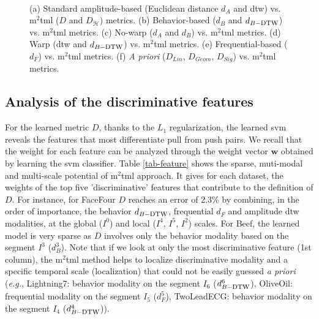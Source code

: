 \begin{figure}[h!]
	\centering
	\
	 \
	 	\	   
	\caption{(a) Standard amplitude-based (Euclidean distance $d_A$  and {\sc dtw}) vs. {\sc m}$^2${\sc tml} ($D$ and $D_{\mathcal{H}}$) metrics. 
	(b) Behavior-based ($d_B$  and $d_{B-\mbox{\sc dtw}}$) vs. {\sc m}$^2${\sc tml} metrics. 	
	(c) No-warp ($d_A$  and $d_{B}$) vs. {\sc m}$^2${\sc tml} metrics. 
	(d) Warp ({\sc dtw}  and $d_{B-\mbox{\sc dtw}}$) vs. {\sc m}$^2${\sc tml}  metrics. 	
	(e) Frequential-based ($d_F$) vs. {\sc m}$^2${\sc tml} metrics.
	(f) \textit{A priori} ($D_{Lin}$, $D_{Geom}$, $D_{Sig}$) vs. {\sc m}$^2${\sc tml} metrics. 
	}
	\label{fig:error2}
\end{figure}


\subsection{Analysis of the discriminative features}
For the learned metric $D$, thanks to the $L_1$ regularization, the learned {\sc svm} reveals the features that most differentiate pull from push pairs. We recall that the weight for each feature can be analyzed through the weight vector $\textbf{w}$ obtained by learning the {\sc svm} classifier. Table \ref{tab-feature} shows the sparse, muti-modal and multi-scale potential of {\sc m}$^2${\sc tml} approach.  It gives for each dataset, the weights of the top five 'discriminative' features that contribute to the definition of $D$.  For instance,   for FaceFour $D$ reaches an error of 2.3\% by combining, in the order of importance, the behavior $d_{B-\mbox{\sc dtw}}$,  frequential $d_F$ and amplitude {\sc dtw} modalities, at the global ($I^0$) and  local ($I^4$, $I^5$, $I^2$) scales. For Beef, the learned model is very sparse as $D$ involves only the behavior modality based on the segment $I^3$ ($d_B^3$). Note that if we look at only the most discriminative feature (1st column), the {\sc m}$^2${\sc tml} method helps to localize discriminative modality and a specific temporal scale (localization) that could not be easily guessed \textit{a priori} (\textit{e.g.}, Lightning7: behavior modality on the segment $I_6$ ($d_{B-\mbox{\sc dtw}}^6$), OliveOil: frequential modality on the segment $I_5$ ($d_F^5$), TwoLeadECG: behavior modality on the segment $I_4$ ($d_{B-\mbox{\sc dtw}}^4$)). 

